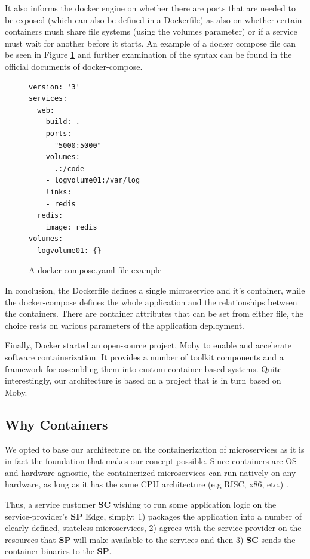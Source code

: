 It also informs the docker engine on whether there are ports that are needed to be exposed (which can also be defined in a Dockerfile) as also on whether certain containers mush share file systems (using the volumes parameter) or if a service must wait for another before it starts. An example of a docker compose file can be seen in Figure \ref{fig:docker-compose} and further examination of the syntax can be found in the official documents\cite{docker-compose} of docker-compose.
\bigbreak
\begin{figure}[H]
\begin{verbatim}
version: '3'
services:
  web:
    build: .
    ports:
    - "5000:5000"
    volumes:
    - .:/code
    - logvolume01:/var/log
    links:
    - redis
  redis:
    image: redis
volumes:
  logvolume01: {}

\end{verbatim}
\caption{A docker-compose.yaml file example \cite{docker-compose}}
\label{fig:docker-compose}
\end{figure}

In conclusion, the Dockerfile defines a single microservice and it’s container, while the docker-compose defines the whole application and the relationships between the containers. There are container attributes that can be set from either file, the choice rests on various parameters of the application deployment.

Finally, Docker started an open-source project, Moby\cite{moby} to enable and accelerate software containerization. It provides a number of toolkit components and a framework for assembling them into custom container-based systems. Quite interestingly, our architecture is based on a project that is in turn based on Moby.


\subsection{Why Containers}

We opted to base our architecture on the containerization of microservices as it is in fact the foundation that makes our concept possible. Since containers are OS and hardware agnostic, the containerized microservices can run natively on any hardware, as long as it has the same CPU architecture (e.g RISC, x86, etc.) .
 
Thus, a service customer \textbf{SC} wishing to run some application logic on the service-provider’s \textbf{SP} Edge, simply: 1) packages the application into a number of clearly defined, stateless microservices, 2) agrees with the service-provider on the resources that \textbf{SP} will make available to the services and then 3) \textbf{SC} sends the container binaries to the \textbf{SP}.
 
